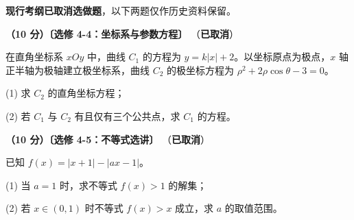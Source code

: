 \begin{gktip}
\textbf{ 现行考纲已取消选做题}，以下两题仅作历史资料保留。
\end{gktip}

\begin{question}
\textbf{（10 分）〔选修 4-4：坐标系与参数方程〕} （\textbf{已取消}）

在直角坐标系 $xOy$ 中，曲线 $C_1$ 的方程为 $y=k|x|+2$。以坐标原点为极点，$x$ 轴正半轴为极轴建立极坐标系，曲线 $C_2$ 的极坐标方程为 $\rho^{2}+2\rho\cos\theta-3=0$。

  (1) 求 $C_2$ 的直角坐标方程；

  (2) 若 $C_1$ 与 $C_2$ 有且仅有三个公共点，求 $C_1$ 的方程。

\end{question}
\begin{question}
\textbf{（10 分）〔选修 4-5：不等式选讲〕} （\textbf{已取消}）

已知 $f(x)=|x+1|-|ax-1|$。

  (1) 当 $a=1$ 时，求不等式 $f(x)>1$ 的解集；

  (2) 若 $x\in(0,1)$ 时不等式 $f(x)>x$ 成立，求 $a$ 的取值范围。

\par\medskip


\end{question}